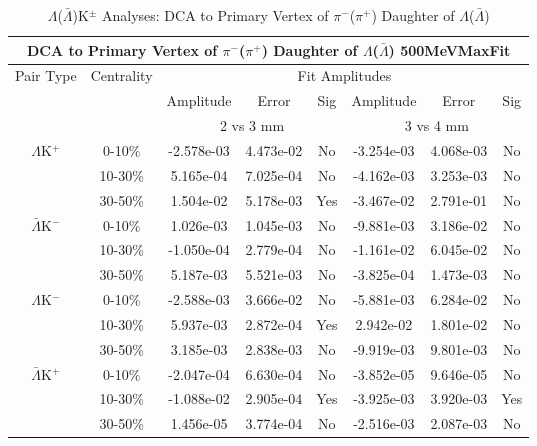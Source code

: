 \documentclass[../AnalysisNoteJBuxton.tex]{subfiles}
\begin{document}
\begin{table}
 \centering
 \begin{tabular}{|c|c|c|c|c||c|c|c|}
  \multicolumn{8}{c}{DCA to Primary Vertex of $\pi^{-}$($\pi^{+}$) Daughter of $\Lambda$($\bar{\Lambda}$) 500MeVMaxFit} \\
  \hline
  \multirow{3}{*}{Pair Type} & \multirow{3}{*}{Centrality} & \multicolumn{6}{c|}{Fit Amplitudes} \\
  \cline{3-8}
   & & Amplitude & Error & Sig & Amplitude & Error & Sig \\  
  \cline{3-8}
   & & \multicolumn{3}{c||}{2 vs 3 mm} & \multicolumn{3}{c|}{3 vs 4 mm} \\  
  \hline
  \multirow{3}{*}{$\Lambda$K$^{+}$}
   &  0-10\% & -2.578e-03 & 4.473e-02 & No & -3.254e-03 & 4.068e-03 & No \\
   & 10-30\% & 5.165e-04 & 7.025e-04 & No & -4.162e-03 & 3.253e-03 & No \\
   & 30-50\% & 1.504e-02 & 5.178e-03 & Yes & -3.467e-02 & 2.791e-01 & No \\
  \hline
  \multirow{3}{*}{$\bar{\Lambda}$K$^{-}$}
   &  0-10\% & 1.026e-03 & 1.045e-03 & No & -9.881e-03 & 3.186e-02 & No \\
   & 10-30\% & -1.050e-04 & 2.779e-04 & No & -1.161e-02 & 6.045e-02 & No \\
   & 30-50\% & 5.187e-03 & 5.521e-03 & No & -3.825e-04 & 1.473e-03 & No \\
  \hline \hline
  \multirow{3}{*}{$\Lambda$K$^{-}$}
   &  0-10\% & -2.588e-03 & 3.666e-02 & No & -5.881e-03 & 6.284e-02 & No \\
   & 10-30\% & 5.937e-03 & 2.872e-04 & Yes & 2.942e-02 & 1.801e-02 & No \\
   & 30-50\% & 3.185e-03 & 2.838e-03 & No & -9.919e-03 & 9.801e-03 & No \\
  \hline
  \multirow{3}{*}{$\bar{\Lambda}$K$^{+}$}
   &  0-10\% & -2.047e-04 & 6.630e-04 & No & -3.852e-05 & 9.646e-05 & No \\
   & 10-30\% & -1.088e-02 & 2.905e-04 & Yes & -3.925e-03 & 3.920e-03 & Yes \\
   & 30-50\% & 1.456e-05 & 3.774e-04 & No & -2.516e-03 & 2.087e-03 & No \\
  \hline
 \end{tabular}
 \caption{$\Lambda$($\bar{\Lambda}$)K$^{\pm}$ Analyses: DCA to Primary Vertex of $\pi^{-}$($\pi^{+}$) Daughter of $\Lambda$($\bar{\Lambda}$)}
 \label{tab:DcaToPrimVertexPionDaughtOfLamLamKch_500MeVMaxFit}
\end{table}
\end{document}
